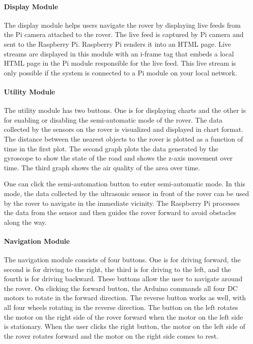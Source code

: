 \documentclass[conference,a4paper]{IEEEtran}
\begin{document}
\paragraph{Display Module}
The display module helps users navigate the rover  by displaying live feeds from the Pi camera attached to the rover. The live feed is captured by Pi camera and  sent to the Raspberry Pi. Raspberry Pi renders it into an HTML page. Live streams are displayed in this module with an i-frame tag that embeds a local HTML page in the Pi module responsible for the live feed. This live stream is only  possible if the system is connected to a Pi module on your local network.

\paragraph{Utility Module}
The utility module has two buttons. One is for displaying charts and the other is for enabling or disabling the semi-automatic mode of the rover. The data collected by the 
sensors on the rover is visualized and displayed in chart format. The distance between the nearest objects to the rover is plotted as a function of time in the first plot. The second graph plots the data generated by the gyroscope to show the state of the road and shows the z-axis movement over time. The third graph shows the air quality of the area over time. 

One can click the semi-automation button to enter semi-automatic mode. In this mode, the data collected by the ultrasonic sensor in front of the rover can be used by the rover to navigate in the immediate vicinity. The Raspberry Pi processes the data from the sensor and then guides the rover forward to avoid obstacles along the way.

\paragraph{Navigation Module}
The navigation module consists of four buttons. One is for driving forward, the second is for driving to the right, the third is for driving to the left, and the fourth is for driving backward. These buttons allow the user to navigate  around the rover. On clicking the forward button, the Arduino commands all  four DC motors to rotate in the forward direction. The reverse button works as well, with all  four wheels rotating in the reverse direction. The button on the left rotates the motor on the right side of the rover forward when the motor on the left side is stationary. When the user clicks the right button, the motor on the left side of the rover rotates forward and the motor on the right side comes to rest.
\end{document}
